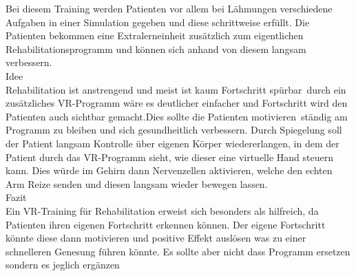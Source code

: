 
Bei diesem Training werden Patienten vor allem bei Lähmungen verschiedene Aufgaben in einer Simulation gegeben und diese schrittweise erfüllt. Die Patienten bekommen eine Extralerneinheit zusätzlich zum eigentlichen Rehabilitationsprogramm und können sich anhand von diesem langsam verbessern.\\

Idee\\
Rehabilitation ist anstrengend und meist ist kaum Fortschritt spürbar durch ein zusätzliches VR-Programm wäre es deutlicher einfacher und Fortschritt wird den Patienten auch sichtbar gemacht.Dies sollte die Patienten motivieren ständig am Programm zu bleiben und sich gesundheitlich verbessern. Durch Spiegelung soll der Patient langsam Kontrolle über eigenen Körper wiedererlangen, in dem der Patient durch das VR-Programm sieht, wie dieser eine virtuelle Hand steuern kann. Dies würde im Gehirn dann Nervenzellen aktivieren, welche den echten Arm Reize senden und diesen langsam wieder bewegen lassen.\\

Fazit\\
Ein VR-Training für Rehabilitation erweist sich besonders als hilfreich, da Patienten ihren eigenen Fortschritt erkennen können. Der eigene Fortschritt könnte diese dann motivieren und positive Effekt auslösen was zu einer schnelleren Genesung führen könnte. Es sollte aber nicht dass Programm ersetzen sondern es jeglich ergänzen


